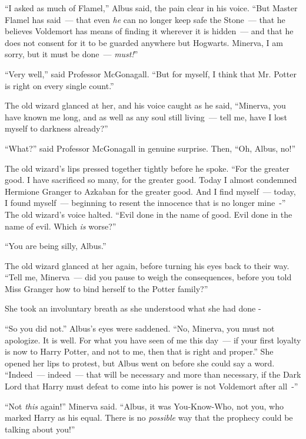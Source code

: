 ``I asked as much of Flamel,'' Albus said, the pain clear in his voice. ``But Master Flamel has said~--- that even \emph{he} can no longer keep safe the Stone~--- that he believes Voldemort has means of finding it wherever it is hidden~--- and that he does not consent for it to be guarded anywhere but Hogwarts. Minerva, I am sorry, but it must be done~--- \emph{must!}''

``Very well,'' said Professor McGonagall. ``But for myself, I think that Mr. Potter is right on every single count.''

The old wizard glanced at her, and his voice caught as he said, ``Minerva, you have known me long, and as well as any soul still living~--- tell me, have I lost myself to darkness already?''

``What?'' said Professor McGonagall in genuine surprise. Then, ``Oh, Albus, no!''

The old wizard's lips pressed together tightly before he spoke. ``For the greater good. I have sacrificed so many, for the greater good. Today I almost condemned Hermione Granger to Azkaban for the greater good. And I find myself~--- today, I found myself~--- beginning to resent the innocence that is no longer mine~-'' The old wizard's voice halted. ``Evil done in the name of good. Evil done in the name of evil. Which \emph{is} worse?''

``You are being silly, Albus.''

The old wizard glanced at her again, before turning his eyes back to their way. ``Tell me, Minerva~--- did you pause to weigh the consequences, before you told Miss Granger how to bind herself to the Potter family?''

She took an involuntary breath as she understood what she had done -

``So you did not.'' Albus's eyes were saddened. ``No, Minerva, you must not apologize. It is well. For what you have seen of me this day~--- if your first loyalty is now to Harry Potter, and not to me, then that is right and proper.'' She opened her lips to protest, but Albus went on before she could say a word. ``Indeed~--- indeed~--- that will be necessary and more than necessary, if the Dark Lord that Harry must defeat to come into his power is not Voldemort after all~-''

``Not \emph{this} again!'' Minerva said. ``Albus, it was You-Know-Who, not you, who marked Harry as his equal. There is no \emph{possible} way that the prophecy could be talking about you!''


